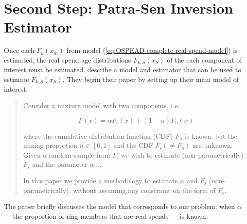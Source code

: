 \documentclass[english]{article}
\begin{document}
\section{Second Step: Patra-Sen Inversion Estimator\label{sec:Second-Step-Patra-Sen}}

Once each $F_{k}(x_{m})$ from model (\ref{eq:OSPEAD-complete-real-spend-model})
is estimated, the real spend age distributions $F_{k,S}(x_{S})$ of
the each component of interest must be estimated. \cite{Patra2016}
describe a model and estimator that can be used to estimate $F_{k,S}(x_{S})$.
They begin their paper by setting up their main model of interest:
\begin{quote}
Consider a mixture model with two components, i.e.

\begin{equation}
F(x)=\alpha F_{\mathrm{s}}(x)+(1-\alpha)F_{\mathrm{b}}(x)\label{eq:patra-sen-main-model}
\end{equation}

where the cumulative distribution function (CDF) $F_{\mathrm{b}}$
is known, but the mixing proportion $\alpha\in[0,1]$ and the CDF
$F_{\mathrm{s}}\left(\neq F_{\mathrm{b}}\right)$ are unknown. Given
a random sample from $F$, we wish to estimate (non-parametrically)
$F_{\mathrm{s}}$ and the parameter $\alpha$....

In this paper we provide a methodology to estimate $\alpha$ and $F_{\mathrm{s}}$
(non-parametrically), without assuming any constraint on the form
of $F_{\mathrm{s}}$.
\end{quote}
The paper briefly discusses the model that corresponds to our problem:
when $\alpha$ --- the proportion of ring members that are real spends
--- is known:
\end{document}
